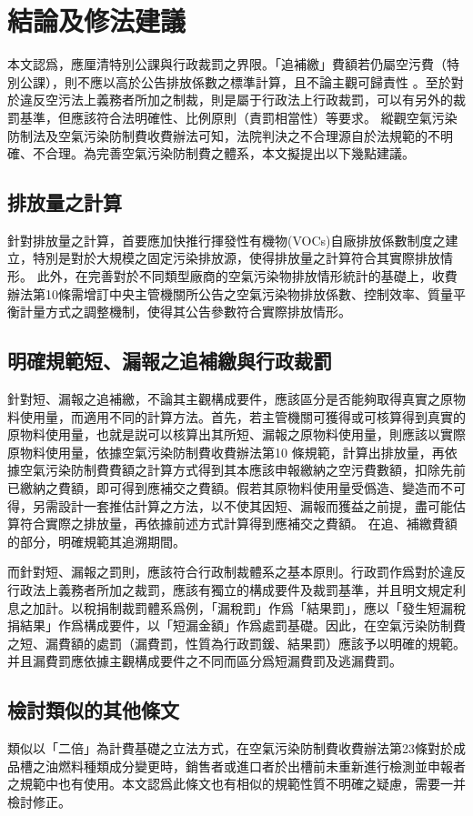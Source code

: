 \section{結論及修法建議}
本文認爲，應厘清特別公課與行政裁罰之界限。「追補繳」費額若仍屬空污費（特別公課），則不應以高於公告排放係數之標準計算，且不論主觀可歸責性
。至於對於違反空污法上義務者所加之制裁，則是屬于行政法上行政裁罰，可以有另外的裁罰基準，但應該符合法明確性、比例原則（責罰相當性）等要求。
縱觀空氣污染防制法及空氣污染防制費收費辦法可知，法院判決之不合理源自於法規範的不明確、不合理。為完善空氣污染防制費之體系，本文擬提出以下幾點建議。
\subsection{排放量之計算}
針對排放量之計算，首要應加快推行揮發性有機物(VOCs)自廠排放係數制度之建立，特別是對於大規模之固定污染排放源，使得排放量之計算符合其實際排放情形。
此外，在完善對於不同類型廠商的空氣污染物排放情形統計的基礎上，收費辦法第10條需增訂中央主管機關所公告之空氣污染物排放係數、控制效率、質量平衡計量方式之調整機制，使得其公告參數符合實際排放情形。


\subsection{明確規範短、漏報之追補繳與行政裁罰}
針對短、漏報之追補繳，不論其主觀構成要件，應該區分是否能夠取得真實之原物料使用量，而適用不同的計算方法。首先，若主管機關可獲得或可核算得到真實的原物料使用量，也就是説可以核算出其所短、漏報之原物料使用量，則應該以實際原物料使用量，依據空氣污染防制費收費辦法第10 條規範，計算出排放量，再依據空氣污染防制費費額之計算方式得到其本應該申報繳納之空污費數額，扣除先前已繳納之費額，即可得到應補交之費額。假若其原物料使用量受僞造、變造而不可得，另需設計一套推估計算之方法，以不使其因短、漏報而獲益之前提，盡可能估算符合實際之排放量，再依據前述方式計算得到應補交之費額。
在追、補繳費額的部分，明確規範其追溯期間。


而針對短、漏報之罰則，應該符合行政制裁體系之基本原則。行政罰作爲對於違反行政法上義務者所加之裁罰，應該有獨立的構成要件及裁罰基準，并且明文規定利息之加計。以稅捐制裁罰體系爲例，「漏稅罰」作爲「結果罰」，應以「發生短漏稅捐結果」作爲構成要件，以「短漏金額」作爲處罰基礎。因此，在空氣污染防制費之短、漏費額的處罰（漏費罰，性質為行政罰鍰、結果罰）應該予以明確的規範。并且漏費罰應依據主觀構成要件之不同而區分爲短漏費罰及逃漏費罰。

\subsection{檢討類似的其他條文}
類似以「二倍」為計費基礎之立法方式，在空氣污染防制費收費辦法第23條對於成品槽之油燃料種類成分變更時，銷售者或進口者於出槽前未重新進行檢測並申報者之規範中也有使用。本文認爲此條文也有相似的規範性質不明確之疑慮，需要一并檢討修正。


